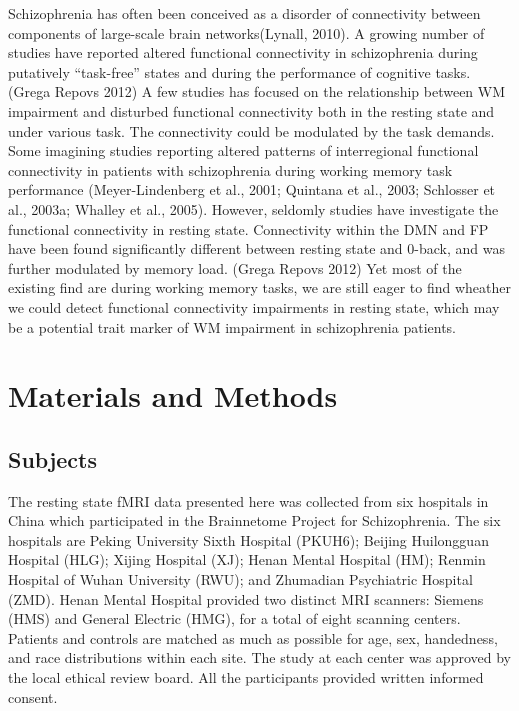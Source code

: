 \documentclass[preprint,authoryear,review,12pt]{elsarticle}
\begin{document}
Schizophrenia has often been conceived as a disorder of connectivity between components of large-scale brain networks(Lynall, 2010). A growing number of studies have reported altered functional connectivity in schizophrenia during putatively “task-free” states and during the performance of cognitive tasks. (Grega Repovs 2012)  A few studies has focused on the relationship between WM impairment and disturbed functional connectivity both in the resting state and under various task. The connectivity could be modulated by the task demands. Some imagining studies reporting altered patterns of interregional functional connectivity in patients with schizophrenia during working memory task performance (Meyer-Lindenberg et al., 2001; Quintana et al., 2003; Schlosser et al., 2003a; Whalley et al., 2005). However, seldomly studies have investigate the functional connectivity in resting state. Connectivity within the DMN and FP have been found significantly different between resting state and 0-back, and was further modulated by memory load. (Grega Repovs 2012) Yet most of the existing find are during working memory tasks, we are still eager to find wheather we could detect functional connectivity impairments in resting state, which may be a potential trait marker of WM impairment in schizophrenia patients.

\section*{Materials and Methods}

\subsection*{Subjects}

The resting state fMRI data presented here was collected from six hospitals in China which participated in the Brainnetome Project for Schizophrenia. The six hospitals are Peking University Sixth Hospital (PKUH6); Beijing Huilongguan Hospital (HLG); Xijing Hospital (XJ); Henan Mental Hospital (HM);  Renmin Hospital of Wuhan University (RWU); and Zhumadian Psychiatric Hospital (ZMD). Henan Mental Hospital provided two distinct MRI scanners: Siemens (HMS) and General Electric (HMG), for a total of eight scanning centers. Patients and controls are matched as much as possible for age, sex, handedness, and race distributions within each site. The study at each center was approved by the local ethical review board. All the participants provided written informed consent.
\end{document}
